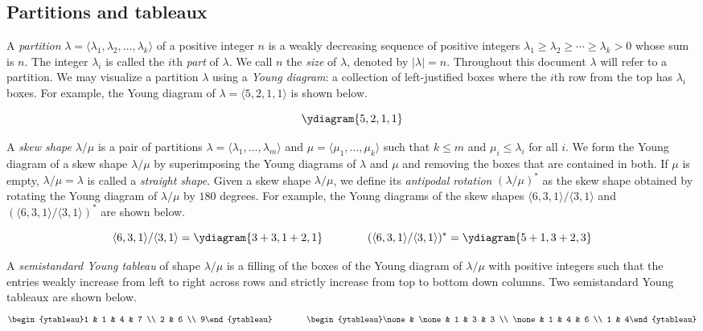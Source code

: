 \documentclass[12pt]{amsart}
\theoremstyle{definition}
\begin{document}
\subsection{Partitions and tableaux}
A \textit{partition} $\lambda=\langle \lambda_1,\lambda_2,\ldots,\lambda_k \rangle$ of a positive integer $n$ is a weakly decreasing sequence of positive integers $\lambda_1 \geq \lambda_2 \geq \cdots \geq \lambda_k > 0$ whose sum is $n$. The integer $\lambda_i$ is called the $i$th \textit{part} of $\lambda$. We call $n$ the \textit{size} of $\lambda$, denoted by $\vert \lambda \vert = n$. Throughout this document $\lambda$ will refer to a partition. We may visualize a partition $\lambda$ using a \textit{Young diagram}: a collection of left-justified boxes where the $i$th row from the top has $\lambda_i$ boxes. For example, the Young diagram of $\lambda = \langle 5,2,1,1 \rangle$ is shown below.

$$\ydiagram{5,2,1,1}$$

A \textit{skew shape} $\lambda/\mu$ is a pair of partitions $\lambda = \langle\lambda_1,\ldots,\lambda_m \rangle$ and $\mu = \langle\mu_1,\ldots,\mu_k\rangle$ such that $k \leq m$ and $\mu_i \leq \lambda_i$ for all $i$. We form the Young diagram of a skew shape $\lambda / \mu$ by superimposing the Young diagrams of $\lambda$ and $\mu$ and removing the boxes that are contained in both. If $\mu$ is empty, $\lambda/\mu=\lambda$ is called a \textit{straight shape}. Given a skew shape $\lambda/\mu$, we define its \textit{antipodal rotation} $(\lambda/\mu)^*$ as the skew shape obtained by rotating the Young diagram of $\lambda/\mu$ by $180$ degrees. For example, the Young diagrams of the skew shapes $\langle 6,3,1 \rangle / \langle 3,1\rangle $ and $(\langle 6,3,1\rangle / \langle 3,1\rangle)^*$ are shown below.

$$\langle 6,3,1 \rangle /\langle 3,1\rangle =\ydiagram{3+3, 1+2, 1} \qquad \qquad (\langle 6,3,1 \rangle /\langle 3,1 \rangle)^*=\ydiagram{5+1, 3+2, 3}$$

A \textit{semistandard Young tableau} of shape $\lambda / \mu$ is a filling of the boxes of the Young diagram of $\lambda / \mu$ with positive integers such that the entries weakly increase from left to right across rows and strictly increase from top to bottom down columns. Two semistandard Young tableaux are shown below.
$$\begin{ytableau}1 & 1 & 4 & 7 \\ 2 & 6 \\ 9\end{ytableau}\qquad\qquad \begin{ytableau}\none & \none & 1 & 3 & 3 \\ \none & 1 & 4 & 6 \\ 1 & 4\end{ytableau}$$
\end{document}
